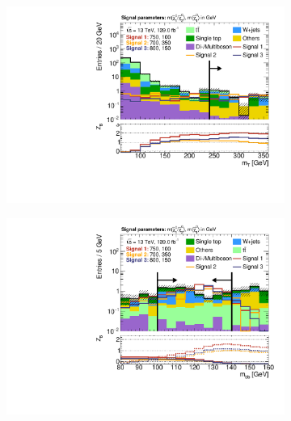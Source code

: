 \begin{figure}
\begin{subfigure}[b]{0.45\linewidth}
		\centering\includegraphics[width=\textwidth]{n1_SRHM_mct_bins/mt_both.pdf}
		\vspace{-2em}
		\caption{\label{fig:Wh_reopt_second_round_n1_srhm_mt}}
	\end{subfigure}%
	\begin{subfigure}[b]{0.45\linewidth}
		\centering\includegraphics[width=\textwidth]{n1_SRHM_mct_bins/mbb_both.pdf}
		\vspace{-2em}
		\caption{\label{fig:Wh_reopt_second_round_n1_srhm_mbb}}
	\end{subfigure}
	\par\medskip
	\begin{subfigure}[b]{0.45\linewidth}

\end{subfigure}
\end{figure}
